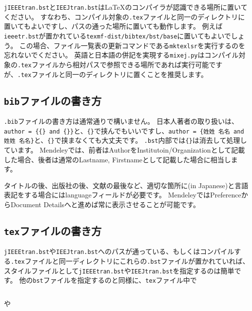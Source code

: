\documentclass[10pt, a4paper]{jsarticle}
\begin{document}
\texttt{jIEEEtran.bst}と\texttt{IEEJtran.bst}は\LaTeX のコンパイラが認識できる場所に置いてください。
すなわち、コンパイル対象の\texttt{.tex}ファイルと同一のディレクトリに置いてもよいですし、パスの通った場所に置いても動作します。
例えば\texttt{ieeetr.bst}が置かれている\texttt{texmf-dist/bibtex/bst/base}に置いてもよいでしょう。
この場合、ファイル一覧表の更新コマンドである\texttt{mktexlsr}を実行するのを忘れないでください。
英語と日本語の併記を実現する\texttt{mixej.py}はコンパイル対象の\texttt{.tex}ファイルから相対パスで参照できる場所であれば実行可能ですが、\texttt{.tex}ファイルと同一のディレクトリに置くことを推奨します。



\subsection{\texttt{bib}ファイルの書き方}

\texttt{.bib}ファイルの書き方は通常通りで構いません。
日本人著者の取り扱いは、\texttt{author = \{\{}\texttt{\} and \{}\texttt{\}\}}と、\texttt{\{\}}で挟んでもいいですし、\texttt{author = \{姓姓 名名 and 姓姓 名名\}}と、\texttt{\{\}}で挟まなくても大丈夫です。
\texttt{.bst}内部では\texttt{\{\}}は消去して処理しています。
Mendeleyでは、前者はAuthorをInstitutoin/Organizationとして記載した場合、後者は通常のLastname, Firstnameとして記載した場合に相当します。

タイトルの後、出版社の後、文献の最後など、適切な箇所に(in Japanese)と言語表記をする場合にはlanguageフィールドが必要です。
MendeleyではPreferenceからDocument Detailsへと進めば常に表示させることが可能です。



\subsection{\texttt{tex}ファイルの書き方}

\texttt{jIEEEtran.bst}や\texttt{IEEJtran.bst}へのパスが通っている、もしくはコンパイルする\texttt{.tex}ファイルと同一ディレクトリにこれらの\texttt{.bst}ファイルが置かれていれば、\BibTeX スタイルファイルとして\texttt{jIEEEtran.bst}や\texttt{IEEJtran.bst}を指定するのは簡単です。
他の\texttt{bst}ファイルを指定するのと同様に、\texttt{tex}ファイル中で

\noindent\makebox[\linewidth]{\rule{\linewidth}{0.4pt}}\vspace{-0.5zw}
\begin{lstlisting}[style=onecol]

\end{lstlisting}\vspace{-1.8zw}
\noindent\makebox[\linewidth]{\rule{\linewidth}{0.4pt}}\vspace{0.5zw}\par
\noindent
や
\end{document}
